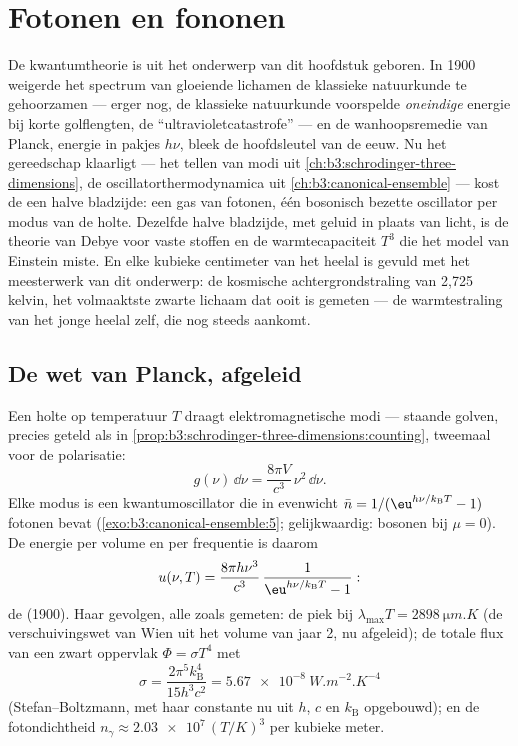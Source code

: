 \chapter{Fotonen en fononen}\label{ch:b3:photons-phonons}

De kwantumtheorie is uit het onderwerp van dit hoofdstuk geboren. In 1900
weigerde het spectrum van gloeiende lichamen de klassieke natuurkunde te
gehoorzamen --- erger nog, de klassieke natuurkunde voorspelde
\emph{oneindige} energie bij korte golflengten, de ``ultravioletcatastrofe''
--- en de wanhoopsremedie van Planck, energie in pakjes $h\nu$, bleek de
hoofdsleutel van de eeuw. Nu het gereedschap klaarligt --- het tellen van
modi uit \cref{ch:b3:schrodinger-three-dimensions}, de
oscillatorthermodynamica uit \cref{ch:b3:canonical-ensemble} --- kost de
 een halve bladzijde: een gas van fotonen, één bosonisch
bezette oscillator per modus van de holte. Dezelfde halve bladzijde, met
geluid in plaats van licht, is de theorie van Debye voor vaste stoffen en
de warmtecapaciteit $T^3$ die het model van Einstein miste. En elke
kubieke centimeter van het heelal is gevuld met het meesterwerk van dit
onderwerp: de kosmische achtergrondstraling van 2,725 kelvin, het
volmaaktste zwarte lichaam dat ooit is gemeten --- de warmtestraling van
het jonge heelal zelf, die nog steeds aankomt.

\section{De wet van Planck, afgeleid}

\begin{theorem}\label{thm:b3:photons-phonons:planck}
Een holte op temperatuur $T$ draagt elektromagnetische modi --- staande
golven, precies geteld als in
\cref{prop:b3:schrodinger-three-dimensions:counting}, tweemaal voor de
polarisatie:
\[
g(\nu)\,\dd\nu = \frac{8\pi V}{c^3}\,\nu^2\,\dd\nu .
\]
Elke modus is een kwantumoscillator die in evenwicht $\bar n = 1/(\eu^{h\nu/k_{\text{B}}T} - 1)$ fotonen bevat
(\cref{exo:b3:canonical-ensemble:5}; gelijkwaardig: bosonen bij $\mu =
0$).
De energie per volume en per frequentie is daarom
\[
u(\nu, T) = \frac{8\pi h\nu^3}{c^3}\,
\frac{1}{\eu^{h\nu/k_{\text{B}}T} - 1} :
\]
de \emph{} (1900). Haar gevolgen, alle zoals gemeten: de
piek bij $\lambda_{\max}T = \qty{2898}{\micro m.K}$ (de
verschuivingswet van Wien uit het volume van jaar 2, nu afgeleid); de
totale flux van een zwart oppervlak $\Phi = \sigma T^4$ met
\[
\sigma = \frac{2\pi^5k_{\text{B}}^4}{15h^3c^2}
 = \qty{5.67e-8}{W.m^{-2}.K^{-4}}
\]
(Stefan--Boltzmann, met haar constante nu uit $h$, $c$ en $k_{\text{B}}$
opgebouwd); en de fotondichtheid $n_\gamma \approx
\num{2.03e7}\,(T/\unit{K})^3$ per kubieke meter.
\end{theorem}

